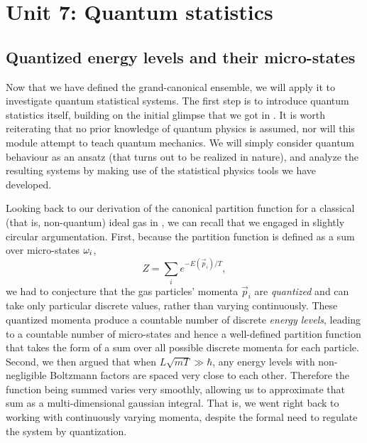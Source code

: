 \renewcommand{\thisunit}{MATH327 Unit 7}
\renewcommand{\moddate}{Last modified 10 Mar.~2022}
\setcounter{section}{7}
\setcounter{subsection}{0}
{}
\section*{Unit 7: Quantum statistics}
\subsection{\label{sec:quantum}Quantized energy levels and their micro-states}
Now that we have defined the grand-canonical ensemble, we will apply it to investigate quantum statistical systems.
The first step is to introduce quantum statistics itself, building on the initial glimpse that we got in .
It is worth reiterating that no prior knowledge of quantum physics is assumed, nor will this module attempt to teach quantum mechanics.
We will simply consider quantum behaviour as an ansatz (that turns out to be realized in nature), and analyze the resulting systems by making use of the statistical physics tools we have developed.

Looking back to our derivation of the canonical partition function for a classical (that is, non-quantum) ideal gas in , we can recall that we engaged in slightly circular argumentation.
First, because the partition function is defined as a sum over micro-states $\omega_i$,
\begin{equation*}
  Z = \sum_i e^{-E(\vec{p}_i) / T},
\end{equation*}
we had to conjecture that the gas particles' momenta $\vec{p}_i$ are \textit{quantized} and can take only particular discrete values, rather than varying continuously.
These quantized momenta produce a countable number of discrete \textit{energy levels}, leading to a countable number of micro-states and hence a well-defined partition function that takes the form of a sum over all possible discrete momenta for each particle.
Second, we then argued that when $L\sqrt{mT} \gg \hbar$, any energy levels with non-negligible Boltzmann factors are spaced very close to each other.
Therefore the function being summed varies very smoothly, allowing us to approximate that sum as a multi-dimensional gaussian integral.
That is, we went right back to working with continuously varying momenta, despite the formal need to regulate the system by quantization.

